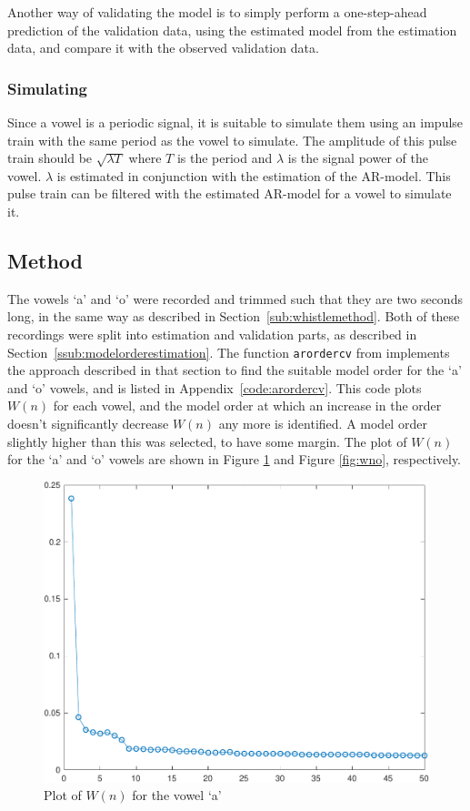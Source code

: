 \documentclass{IEEEtran}
\newcommand{\code}[1]{\texttt{#1}}
\begin{document}
Another way of validating the model is to simply perform a one-step-ahead
prediction of the validation data, using the estimated model from the
estimation data, and compare it with the observed validation data.

\subsubsection{Simulating}
Since a vowel is a periodic signal, it is suitable to simulate them using an
impulse train with the same period as the vowel to simulate. The amplitude
of this pulse train should be $\sqrt{\lambda T}$ where $T$ is the period and
$\lambda$ is the signal power of the vowel. $\lambda$ is estimated in conjunction with the
estimation of the AR-model.
This pulse train can be filtered with the estimated AR-model for a vowel
to simulate it.

\subsection{Method}
The vowels `a' and `o' were recorded and trimmed such that they are two seconds
long, in the same way as described in Section~\ref{sub:whistlemethod}.
Both of these recordings were split into estimation and validation parts,
as described in Section~\ref{ssub:modelorderestimation}. The function
\code{arordercv} from \cite{signalproc} implements the approach described in
that section to find the suitable model order for the `a' and `o' vowels, and is
listed in Appendix~\ref{code:arordercv}. This code plots $W(n)$ for each
vowel, and the model order at which an increase in the order doesn't
significantly decrease $W(n)$ any more is identified. A model order slightly
higher than this was selected, to have some margin. The plot of $W(n)$ for the
`a' and `o' vowels are shown in Figure \ref{fig:wna} and Figure \ref{fig:wno},
respectively.

\begin{figure}[h!]
    \centering
    \captionsetup{justification=centering}
    \includegraphics[width=0.8\columnwidth]{pictures/wna.pdf}
    \caption{Plot of $W(n)$ for the vowel `a'}
    \label{fig:wna}
\end{figure}
\end{document}
